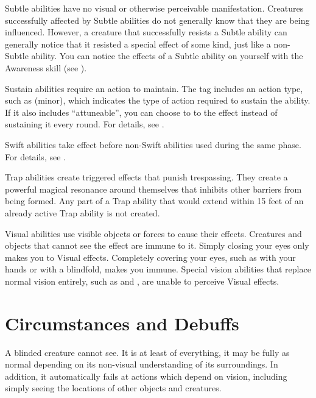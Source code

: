    Subtle abilities have no visual or otherwise perceivable manifestation.
  Creatures successfully affected by Subtle abilities do not generally know that they are being influenced.
  However, a creature that successfully resists a Subtle ability can generally notice that it resisted a special effect of some kind, just like a non-Subtle ability.
  You can notice the effects of a Subtle ability on yourself with the Awareness skill (see ).

   Sustain abilities require an action to maintain.
  The tag includes an action type, such as (minor), which indicates the type of action required to sustain the ability.
  If it also includes ``attuneable'', you can choose to  to the effect instead of sustaining it every round.
  For details, see .

   Swift abilities take effect before non-Swift abilities used during the same phase.
  For details, see .

   Trap abilities create triggered effects that punish trespassing.
  They create a powerful magical resonance around themselves that inhibits other barriers from being formed.
  Any part of a Trap ability that would extend within 15 feet of an already active Trap ability is not created.

   Visual abilities use visible objects or forces to cause their effects.
  Creatures and objects that cannot see the effect are immune to it.
  Simply closing your eyes only makes you \impervious to Visual effects.
  Completely covering your eyes, such as with your hands or with a blindfold, makes you immune.
  Special vision abilities that replace normal vision entirely, such as  and , are unable to perceive Visual effects.

  \newpage
\section{Circumstances and Debuffs}\label{Circumstances and Debuffs}

   A blinded creature cannot see.
  It is at least \partiallyunaware of everything, it may be fully \unaware as normal depending on its non-visual understanding of its surroundings.
  In addition, it automatically fails at actions which depend on vision, including simply seeing the locations of other objects and creatures.

